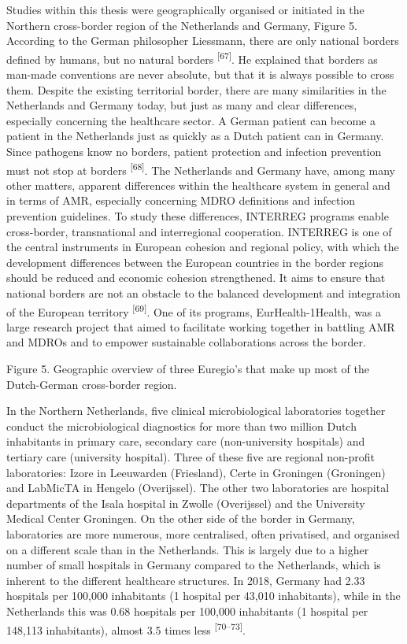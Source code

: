 \documentclass[
]{book}
\begin{document}
Studies within this thesis were geographically organised or initiated in the Northern cross-border region of the Netherlands and Germany, Figure 5. According to the German philosopher Liessmann, there are only national borders defined by humans, but no natural borders \textsuperscript{{[}67{]}}. He explained that borders as man-made conventions are never absolute, but that it is always possible to cross them. Despite the existing territorial border, there are many similarities in the Netherlands and Germany today, but just as many and clear differences, especially concerning the healthcare sector. A German patient can become a patient in the Netherlands just as quickly as a Dutch patient can in Germany. Since pathogens know no borders, patient protection and infection prevention must not stop at borders \textsuperscript{{[}68{]}}. The Netherlands and Germany have, among many other matters, apparent differences within the healthcare system in general and in terms of AMR, especially concerning MDRO definitions and infection prevention guidelines. To study these differences, INTERREG programs enable cross-border, transnational and interregional cooperation. INTERREG is one of the central instruments in European cohesion and regional policy, with which the development differences between the European countries in the border regions should be reduced and economic cohesion strengthened. It aims to ensure that national borders are not an obstacle to the balanced development and integration of the European territory \textsuperscript{{[}69{]}}. One of its programs, EurHealth-1Health, was a large research project that aimed to facilitate working together in battling AMR and MDROs and to empower sustainable collaborations across the border.

Figure 5. Geographic overview of three Euregio's that make up most of the Dutch-German cross-border region.

In the Northern Netherlands, five clinical microbiological laboratories together conduct the microbiological diagnostics for more than two million Dutch inhabitants in primary care, secondary care (non-university hospitals) and tertiary care (university hospital). Three of these five are regional non-profit laboratories: Izore in Leeuwarden (Friesland), Certe in Groningen (Groningen) and LabMicTA in Hengelo (Overijssel). The other two laboratories are hospital departments of the Isala hospital in Zwolle (Overijssel) and the University Medical Center Groningen. On the other side of the border in Germany, laboratories are more numerous, more centralised, often privatised, and organised on a different scale than in the Netherlands. This is largely due to a higher number of small hospitals in Germany compared to the Netherlands, which is inherent to the different healthcare structures. In 2018, Germany had 2.33 hospitals per 100,000 inhabitants (1 hospital per 43,010 inhabitants), while in the Netherlands this was 0.68 hospitals per 100,000 inhabitants (1 hospital per 148,113 inhabitants), almost 3.5 times less \textsuperscript{{[}70--73{]}}.
\end{document}
